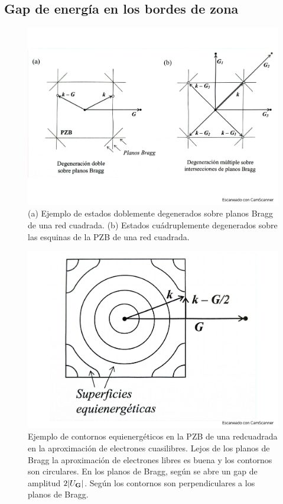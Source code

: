 \subsection{Gap de energía en los bordes de zona}
\begin{figure}[h!] \centering
    \includegraphics[scale=0.5]{Cuerpo/Ch_07/Fotos libro 2.pdf}
    \caption{(a) Ejemplo de estados doblemente degenerados sobre planos Bragg de una red cuadrada. (b) Estados cuádruplemente degenerados sobre las esquinas de la PZB de una red cuadrada.}
    \label{Fig:07-02}
\end{figure}    

\begin{figure}[h!] \centering
    \includegraphics[scale=0.5]{Cuerpo/Ch_07/Fotos libro 3.pdf}
    \caption{Ejemplo de contornos equienergéticos en la PZB de una redcuadrada en la aproximación de electrones cuasilibres. Lejos de los planos de Bragg la aproximación de electrones libres es buena y los contornos son circulares. En los planos de Bragg, según se abre un gap de amplitud $2|U_{\mathbf{G}}|$. Según los contornos son perpendiculares a los planos de Bragg.}
    \label{Fig:07-03}
\end{figure}    


